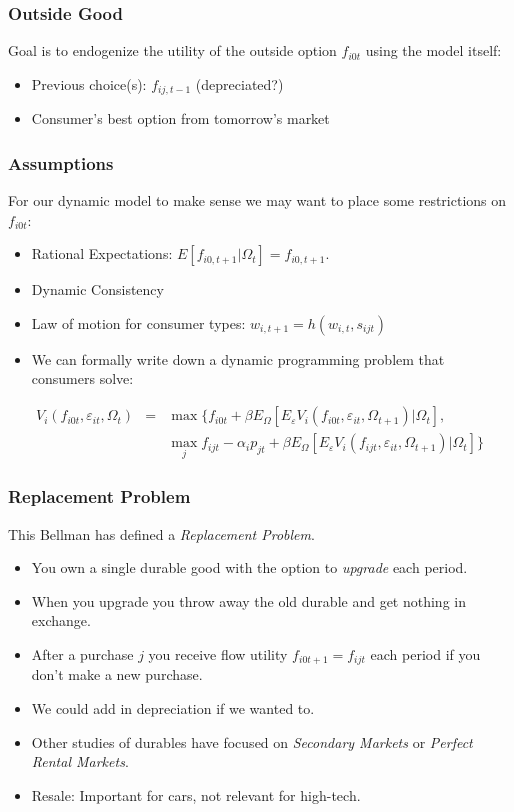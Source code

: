 \begin{frame}
\frametitle{Outside Good}
Goal is to endogenize the utility of the outside option $f_{i0t}$ using the model itself:
\begin{itemize}
\item Previous choice(s): $f_{ij,t-1}$ (depreciated?)
\item Consumer's best option from tomorrow's market
\end{itemize}
\vspace{0.5cm}
\end{frame}

\begin{frame}
\frametitle{Assumptions}
For our dynamic model to make sense we may want to place some restrictions on $f_{i0t}$:
\begin{itemize}
\item Rational Expectations: $E[f_{i0,t+1} | \Omega_t ] =f_{i0,t+1}$.
\item Dynamic Consistency
\item Law of motion for consumer types: $w_{i,t+1} =h(w_{i,t},s_{ijt})$ 
\item We can formally write down a dynamic programming problem that consumers solve:
\end{itemize}
\begin{eqnarray*}
V_i(f_{i0t},\varepsilon_{i t}, \Omega_t) &=& \max \{ f_{i0t} + \beta E_{\Omega}[ E_{\varepsilon} V_i (f_{i0t}, \varepsilon_{it}, \Omega_{t+1}) |\Omega_{t} ] ,\\
&& \max_j f_{ijt}  -\alpha_i p_{jt} + \beta E_{\Omega}[ E_{\varepsilon} V_i (f_{ijt}, \varepsilon_{it}, \Omega_{t+1}) |\Omega_{t} ]  \}
\end{eqnarray*}
\end{frame}

\begin{frame}
\frametitle{Replacement Problem}
This Bellman has defined a \textit{Replacement Problem}.
\begin{itemize}
\item You own a single durable good with the option to \textit{upgrade} each period.
\item When you upgrade \alert{you throw away the old durable and get nothing in exchange}.
\item After a purchase $j$  you receive flow utility $f_{i0t+1} = f_{ijt}$ each period if you don't make a new purchase.
\item We could add in depreciation if we wanted to.
\item Other studies of durables have focused on \textit{Secondary Markets} or \textit{Perfect Rental Markets}.
\item Resale: Important for cars, not relevant for high-tech.
\end{itemize}
\end{frame}





